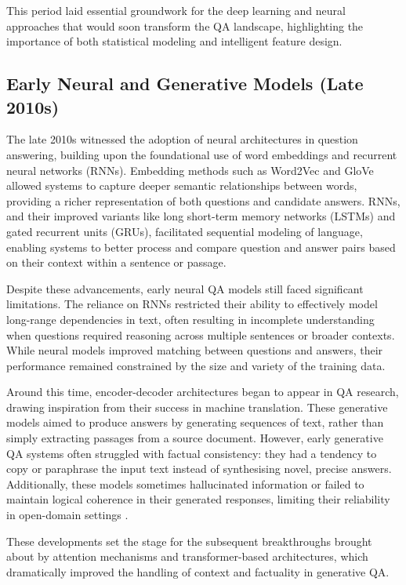 \begin{spacing}{1.5}
This period laid essential groundwork for the deep learning and neural approaches that would soon transform the QA landscape, highlighting the importance of both statistical modeling and intelligent feature design.

\subsection{Early Neural and Generative Models (Late 2010s)}
The late 2010s witnessed the adoption of neural architectures in question answering, building upon the foundational use of word embeddings and recurrent neural networks (RNNs). Embedding methods such as Word2Vec \citep{mikolov_efficient_2013} and GloVe \citep{pennington_glove_2014} allowed systems to capture deeper semantic relationships between words, providing a richer representation of both questions and candidate answers. RNNs, and their improved variants like long short-term memory networks (LSTMs) and gated recurrent units (GRUs), facilitated sequential modeling of language, enabling systems to better process and compare question and answer pairs based on their context within a sentence or passage.

Despite these advancements, early neural QA models still faced significant limitations. The reliance on RNNs restricted their ability to effectively model long-range dependencies in text, often resulting in incomplete understanding when questions required reasoning across multiple sentences or broader contexts. While neural models improved matching between questions and answers, their performance remained constrained by the size and variety of the training data.

Around this time, encoder-decoder architectures began to appear in QA research, drawing inspiration from their success in machine translation. These generative models aimed to produce answers by generating sequences of text, rather than simply extracting passages from a source document. However, early generative QA systems often struggled with factual consistency: they had a tendency to copy or paraphrase the input text instead of synthesising novel, precise answers. Additionally, these models sometimes hallucinated information or failed to maintain logical coherence in their generated responses, limiting their reliability in open-domain settings \citep{caballero_brief_2021}.

These developments set the stage for the subsequent breakthroughs brought about by attention mechanisms and transformer-based architectures, which dramatically improved the handling of context and factuality in generative QA.


\end{spacing}
